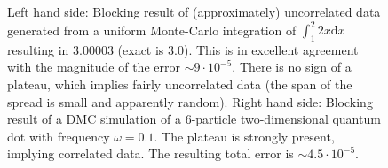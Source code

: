 \begin{figure}
 \begin{center}
  \caption{Left hand side: Blocking result of (approximately) uncorrelated data generated from a uniform Monte-Carlo integration of $\int _1^2 2x\mathrm{d}x$ resulting in $3.00003$ (exact is $3.0$). This is in excellent agreement with the magnitude of the error $\sim 9\cdot 10^{-5}$. There is no sign of a plateau, which implies fairly uncorrelated data (the span of the spread is small and apparently random). Right hand side: Blocking result of a DMC simulation of a 6-particle two-dimensional quantum dot with frequency $\omega=0.1$. The plateau is strongly present, implying correlated data. The resulting total error is  $\sim 4.5\cdot 10^{-5}$.}
  \label{FIG:BlockingExamples}
 \end{center}
\end{figure}


